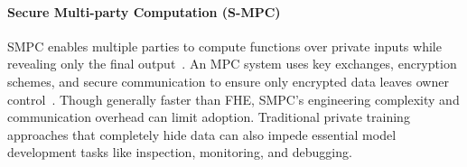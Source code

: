 

\paragraph{Secure Multi-party Computation (S-MPC)}  SMPC enables multiple parties to compute functions over private inputs while revealing only the final output~\cite{yao1982protocols,shamir1979share}. An MPC system uses key exchanges, encryption schemes, and secure communication to ensure only encrypted data leaves owner control~\cite{micali1987play}. Though generally faster than FHE, SMPC's engineering complexity and communication overhead can limit adoption. Traditional private training approaches that completely hide data can also impede essential model development tasks like inspection, monitoring, and debugging.


